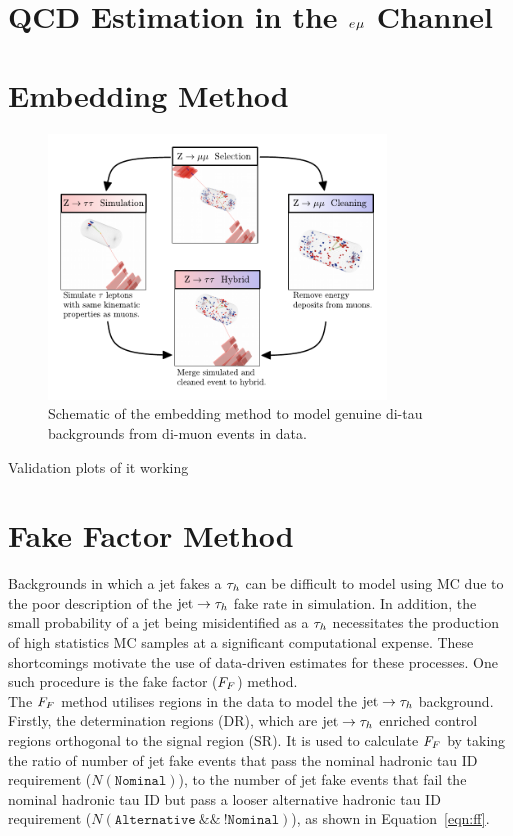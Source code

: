\section{QCD Estimation in the $e_{}\mu_{}$ Channel}
\label{sec:qcd}

\section{Embedding Method}
\label{sec:embedding}

\begin{figure}[!hbtp]
\centering
    \includegraphics[width=0.8\textwidth]{Figures/Embedding_Diagram.pdf}
\caption{Schematic of the embedding method to model genuine di-tau backgrounds from di-muon events in data.}
\label{fig:embedding}
\end{figure}

Validation plots of it working

\section{Fake Factor Method}
\label{sec:ff}

Backgrounds in which a jet fakes a $\tau_{h}$ can be difficult to model using MC due to the poor description of the $\text{jet}\rightarrow\tau_{h}$ fake rate in simulation. 
In addition, the small probability of a jet being misidentified as a $\tau_{h}$ necessitates the production of high statistics MC samples at a significant computational expense.
These shortcomings motivate the use of data-driven estimates for these processes. 
One such procedure is the fake factor ($F_{F}$) method. \\

The $F_{F}$ method utilises regions in the data to model the $\text{jet}\rightarrow\tau_{h}$ background. 
Firstly, the determination regions (DR), which are $\text{jet}\rightarrow\tau_{h}$ enriched control regions orthogonal to the signal region (SR). 
It is used to calculate $F_{F}$ by taking the ratio of number of jet fake events that pass the nominal hadronic tau ID requirement ($N(\texttt{Nominal})$), to the number of jet fake events that fail the nominal hadronic tau ID but pass a looser alternative hadronic tau ID requirement ($N(\texttt{Alternative}~\&\&~\texttt{!Nominal})$), as shown in Equation~\ref{eqn:ff}.

